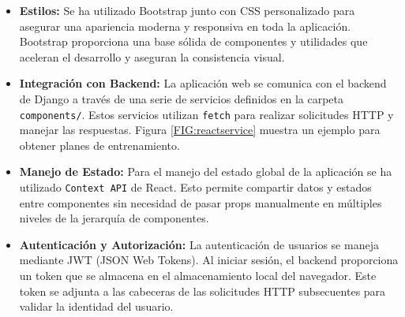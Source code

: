 \begin{itemize}
    \item \textbf{Estilos:} Se ha utilizado Bootstrap junto con CSS personalizado para asegurar una apariencia moderna y responsiva en toda la aplicación. Bootstrap proporciona una base sólida de componentes y utilidades que aceleran el desarrollo y aseguran la consistencia visual.

    \item \textbf{Integración con Backend:} La aplicación web se comunica con el backend de Django a través de una serie de servicios definidos en la carpeta \texttt{components/}. Estos servicios utilizan \texttt{fetch} para realizar solicitudes HTTP y manejar las respuestas. Figura \ref{FIG:reactservice} muestra un ejemplo para obtener planes de entrenamiento.

    \item \textbf{Manejo de Estado:} Para el manejo del estado global de la aplicación se ha utilizado \texttt{Context API} de React. Esto permite compartir datos y estados entre componentes sin necesidad de pasar props manualmente en múltiples niveles de la jerarquía de componentes.

    \item \textbf{Autenticación y Autorización:} La autenticación de usuarios se maneja mediante JWT (JSON Web Tokens). Al iniciar sesión, el backend proporciona un token que se almacena en el almacenamiento local del navegador. Este token se adjunta a las cabeceras de las solicitudes HTTP subsecuentes para validar la identidad del usuario.

\end{itemize}